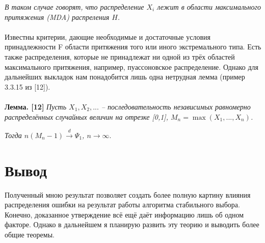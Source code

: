 \documentclass[14pt,a4paper]{extarticle}
\begin{document}
\textit{В таком случае говорят, что распределение $X_i$ лежит в области максимального притяжения (MDA) распреления $H$.}
\\
\\
Известны критерии, дающие необходимые и
достаточные условия принадлежности F области притяжения того или иного экстремального типа. Есть также
распределения, которые не принадлежат ни одной из трёх областей максимального притяжения, например, пуассоновское распределение. Однако для дальнейших выкладок нам понадобится лишь одна нетрудная лемма (пример 3.3.15 из [12]).
\\
\\
\textbf{Лемма. [12]} \textit{Пусть $X_1, X_2, ...$ -- последовательность независимых равномерно распределённых случайных величин на отрезке [0,1], $M_n = \max(X_1,...,X_n)$.} 

\textit{Тогда $n(M_n - 1) \xrightarrow{d} \Psi_1$, $n \rightarrow \infty$}.




\section{Вывод}

Полученный мною результат позволяет создать более полную картину влияния распределения ошибки на результат работы алгоритма стабильного выбора. Конечно, доказанное утверждение всё ещё даёт информацию лишь об одном факторе. Однако в дальнейшем я планирую развить эту теорию и выводить более общие теоремы.



\newpage
\end{document}
